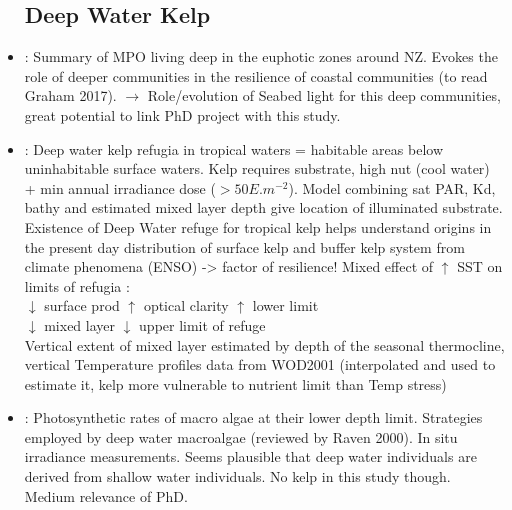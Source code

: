 \documentclass[]{report}
\begin{document}
\begin{itemize}
		\subsection{Deep Water Kelp}
		 \item \cite{nelson2015beyond} : Summary of MPO living deep in the euphotic zones around NZ. Evokes the role of deeper communities in the resilience of coastal communities (to read Graham 2017). $\rightarrow$ Role/evolution of Seabed light for this deep communities, great potential to link PhD project with this study.
		 \item \cite{graham2007deep} : Deep water kelp refugia in tropical waters = habitable areas below uninhabitable surface waters. Kelp requires substrate, high nut (cool water) + min annual irradiance dose ($>50E.m^{-2}$). Model combining sat PAR, Kd, bathy and estimated mixed layer depth give location of illuminated substrate. Existence of Deep Water refuge for tropical kelp helps understand origins in the present day distribution of surface kelp and buffer kelp system from climate phenomena (ENSO) -> factor of resilience! Mixed effect of $\uparrow$ SST on limits of refugia :
		 \\ $\downarrow$ surface prod $\uparrow$ optical clarity $\uparrow$ lower limit
		 \\ $\downarrow$ mixed layer $\downarrow$ upper limit of refuge 
		 \\ Vertical extent of mixed layer estimated by depth of the seasonal thermocline, vertical Temperature profiles data from WOD2001 (interpolated and used to estimate it, kelp more vulnerable to nutrient limit than Temp stress)
		  \item \cite{runcie2008situ} : Photosynthetic rates of macro algae at their lower depth limit. Strategies employed by deep water macroalgae (reviewed by Raven 2000). In situ irradiance measurements. Seems plausible that deep water individuals are derived from shallow water individuals. No kelp in this study though. Medium relevance of PhD.
	\end{itemize}
	
	
\end{document}
